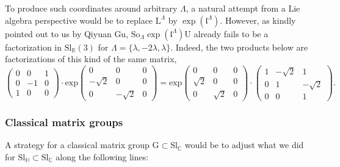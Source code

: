\documentclass[reqno]{amsart}
\renewcommand{\ll}{\mathfrak{l}}
\newcommand{\R}{\mathbb{R}}
\newcommand{\C}{\mathbb{C}}
\newcommand{\Sl}{\mathrm{Sl}}
\newcommand{\So}{\mathrm{So}}
\renewcommand{\L}{\mathrm{L}}
\newcommand{\U}{\mathrm{U}}
\theoremstyle{definition} %
\begin{document}
To produce such coordinates around arbitrary $\Lambda$, a natural attempt from a Lie algebra perspective would be to replace  $\L^\Lambda$ by $\exp(\ll^\Lambda)$. However, as kindly pointed out to us by Qiyuan Gu, $\So_\Lambda\exp(\ll^\Lambda)\U$ already fails to be a factorization in $\Sl_\R(3)$ for $\Lambda=\{\lambda,-2\lambda,\lambda\}$. Indeed, the two products below are factorizations of this kind of the same matrix,
\[\begin{pmatrix} 0 & 0 & 1\\0 & -1 & 0\\ 1 & 0 & 0\end{pmatrix}\cdot\mathrm{exp}\begin{pmatrix} 0 & 0 & 0 \\ -\sqrt{2} & 0 & 0\\  0& -\sqrt{2}  &0 \end{pmatrix}=\mathrm{exp}\begin{pmatrix} 0 & 0 & 0 \\ \sqrt{2} & 0 & 0\\ 0& \sqrt{2}  &0 \end{pmatrix}\cdot\begin{pmatrix} 1 & -\sqrt{2} & 1 \\ 0 & 1 & -\sqrt{2}\\ 0 & 0 & 1 \end{pmatrix}.
\]

\subsubsection{Classical matrix groups}
A  strategy for a classical matrix group  $\mathrm{G}\subset \Sl_\C$  would be to adjust what we did for  $\Sl_\mathbb{H}\subset \Sl_\C$ along the following lines:
\end{document}
